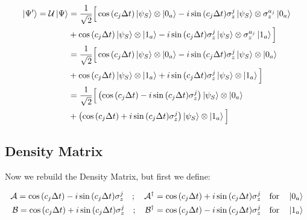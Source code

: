 \documentclass[a4paper,12pt]{article}
\begin{document}
	\begin{align}
		\ket{\Psi'} = \mathcal{U} \ket{\Psi}
		&= \frac{1}{\sqrt{2}} \Big[ \cos{\left(c_j \Delta t\right)} \ket{\psi_{S}} \otimes \ket{0_a} - i\sin{\left(c_j \Delta t \right)} \sigma_{z}^{j} \ket{\psi_{S}} \otimes \sigma_{z}^{a_j}\ket{0_a} \notag \\
		& + \cos{\left(c_j \Delta t\right)} \ket{\psi_{S}} \otimes \ket{1_a} - i\sin{\left(c_j \Delta t \right)} \sigma_{z}^{j} \ket{\psi_{S}} \otimes \sigma_{z}^{a_j}\ket{1_a} \Big] \notag \\
		&= \frac{1}{\sqrt{2}} \Big[ \cos{\left(c_j \Delta t\right)} \ket{\psi_{S}} \otimes \ket{0_a} - i\sin{\left(c_j \Delta t \right)} \sigma_{z}^{j} \ket{\psi_{S}} \otimes \ket{0_a} \notag \\
		& + \cos{\left(c_j \Delta t\right)} \ket{\psi_{S}} \otimes \ket{1_a} + i\sin{\left(c_j \Delta t \right)} \sigma_{z}^{j} \ket{\psi_{S}} \otimes \ket{1_a} \Big] \notag \\
		&= \frac{1}{\sqrt{2}} \Big[ \left( \cos{\left(c_j \Delta t\right)} - i\sin{\left(c_j \Delta t \right)} \sigma_{z}^{j}\right) \ket{\psi_{S}} \otimes \ket{0_a}  \notag \\
		& + \left( \cos{\left(c_j \Delta t\right)} + i\sin{\left(c_j \Delta t \right)}  \sigma_{z}^{j}\right) \ket{\psi_{S}} \otimes \ket{1_a}  \Big] 
	\end{align}
	
	\subsection{Density Matrix}
	
		Now we rebuild the Density Matrix, but first we define:
	
	\begin{equation*}
	\begin{aligned}
		\mathcal{A} = \cos{\left( c_j \Delta t \right)} - i \sin{\left( c_j \Delta t \right)} \sigma_{z}^{j} \quad ; \quad \mathcal{A^{\dagger}} = \cos{\left( c_j \Delta t \right)} + i \sin{\left( c_j \Delta t \right)} \sigma_{z}^{j} \quad \text{for} \quad \ket{0_a}\\
		\mathcal{B} = \cos{\left( c_j \Delta t \right)} + i \sin{\left( c_j \Delta t \right)} \sigma_{z}^{j} \quad ; \quad \mathcal{B^{\dagger}} = \cos{\left( c_j \Delta t \right)} - i \sin{\left( c_j \Delta t \right)} \sigma_{z}^{j}  \quad \text{for} \quad \ket{1_a} 
	\end{aligned}
	\end{equation*}
\end{document}

